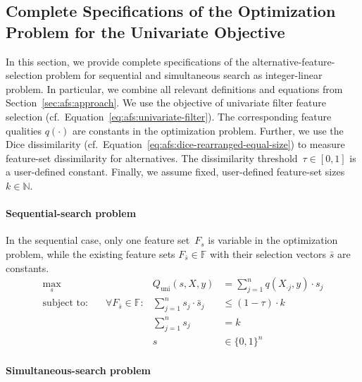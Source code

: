 \documentclass{article}
\theoremstyle{definition}
\begin{document}
\subsection{Complete Specifications of the Optimization Problem for the Univariate Objective}
\label{sec:afs:appendix:univariate-complete-optimization-problem}

In this section, we provide complete specifications of the alternative-feature-selection problem for sequential and simultaneous search as integer-linear problem.
In particular, we combine all relevant definitions and equations from Section~\ref{sec:afs:approach}.
We use the objective of univariate filter feature selection (cf.~Equation~\ref{eq:afs:univariate-filter}).
The corresponding feature qualities $q(\cdot)$ are constants in the optimization problem.
Further, we use the Dice dissimilarity (cf.~Equation~\ref{eq:afs:dice-rearranged-equal-size}) to measure feature-set dissimilarity for alternatives.
The dissimilarity threshold~$\tau \in [0,1]$ is a user-defined constant.
Finally, we assume fixed, user-defined feature-set sizes~$k \in \mathbb{N}$.

\paragraph{Sequential-search problem}

In the sequential case, only one feature set~$F_s$ is variable in the optimization problem, while the existing feature sets $F_{\bar{s}} \in \mathbb{F}$ with their selection vectors $\bar{s}$ are constants.
%
\begin{equation}
	\begin{aligned}
		\max_s &\quad & Q_{\text{uni}}(s,X,y) &= \sum_{j=1}^{n} q(X_{\cdot{}j},y) \cdot s_j \\
		\text{subject to:} &\quad \forall F_{\bar{s}} \in \mathbb{F}: & \sum_{j=1}^n s_j \cdot \bar{s}_j &\leq (1 - \tau) \cdot k \\
		&\quad & \sum_{j=1}^n s_j &= k \\
		&\quad & s &\in \{0,1\}^n
	\end{aligned}
	\label{eq:afs:afs-sequential-complete}
\end{equation}
%
\paragraph{Simultaneous-search problem}
\end{document}
